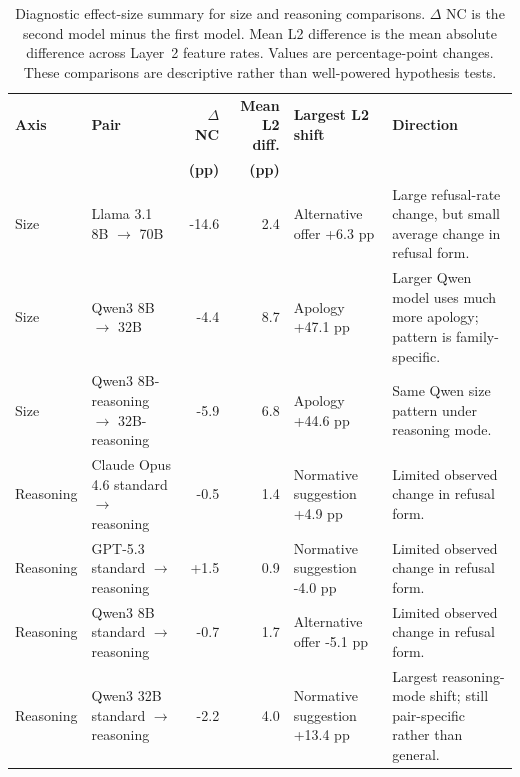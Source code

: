 \begin{table}[t]
\centering
\small
\setlength{\tabcolsep}{3.5pt}
\begin{tabular}{llrrlp{4.5cm}}
\toprule
\textbf{Axis} & \textbf{Pair} & \textbf{$\Delta$ NC} & \textbf{Mean L2 diff.} & \textbf{Largest L2 shift} & \textbf{Direction} \\
 & & \textbf{(pp)} & \textbf{(pp)} & & \\
\midrule
Size &
Llama 3.1 8B $\rightarrow$ 70B &
-14.6 & 2.4 &
Alternative offer +6.3 pp &
Large refusal-rate change, but small average change in refusal form. \\

Size &
Qwen3 8B $\rightarrow$ 32B &
-4.4 & 8.7 &
Apology +47.1 pp &
Larger Qwen model uses much more apology; pattern is family-specific. \\

Size &
Qwen3 8B-reasoning $\rightarrow$ 32B-reasoning &
-5.9 & 6.8 &
Apology +44.6 pp &
Same Qwen size pattern under reasoning mode. \\
\addlinespace
Reasoning &
Claude Opus 4.6 standard $\rightarrow$ reasoning &
-0.5 & 1.4 &
Normative suggestion +4.9 pp &
Limited observed change in refusal form. \\

Reasoning &
GPT-5.3 standard $\rightarrow$ reasoning &
+1.5 & 0.9 &
Normative suggestion -4.0 pp &
Limited observed change in refusal form. \\

Reasoning &
Qwen3 8B standard $\rightarrow$ reasoning &
-0.7 & 1.7 &
Alternative offer -5.1 pp &
Limited observed change in refusal form. \\

Reasoning &
Qwen3 32B standard $\rightarrow$ reasoning &
-2.2 & 4.0 &
Normative suggestion +13.4 pp &
Largest reasoning-mode shift; still pair-specific rather than general. \\
\bottomrule
\end{tabular}
\caption{Diagnostic effect-size summary for size and reasoning comparisons.
$\Delta$ NC is the second model minus the first model. Mean L2 difference is
the mean absolute difference across Layer~2 feature rates. Values are
percentage-point changes. These comparisons are descriptive rather than
well-powered hypothesis tests.}
\label{tab:size_reasoning_effect_direction}
\end{table}
